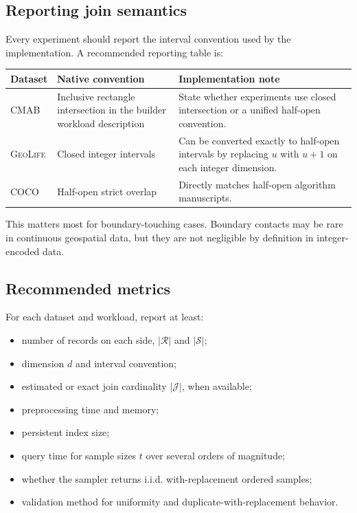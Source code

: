 \documentclass[11pt]{article}
\newcommand{\Rrel}{\mathcal R}
\newcommand{\Srel}{\mathcal S}
\newcommand{\Jset}{\mathcal J}
\newcommand{\cmab}{\textsc{CMAB}}
\newcommand{\geolife}{\textsc{GeoLife}}
\newcommand{\coco}{\textsc{COCO}}
\begin{document}
\subsection{Reporting join semantics}

Every experiment should report the interval convention used by the implementation.  A recommended reporting table is:
\begin{center}
\small
\begin{tabularx}{\textwidth}{@{}lYY@{}}
\toprule
Dataset & Native convention & Implementation note \\
\midrule
\cmab{} & Inclusive rectangle intersection in the builder workload description & State whether experiments use closed intersection or a unified half-open convention. \\
\geolife{} & Closed integer intervals & Can be converted exactly to half-open intervals by replacing $u$ with $u+1$ on each integer dimension. \\
\coco{} & Half-open strict overlap & Directly matches half-open algorithm manuscripts. \\
\bottomrule
\end{tabularx}
\end{center}

This matters most for boundary-touching cases.  Boundary contacts may be rare in continuous geospatial data, but they are not negligible by definition in integer-encoded data.

\subsection{Recommended metrics}

For each dataset and workload, report at least:
\begin{itemize}[leftmargin=2em,itemsep=2pt]
  \item number of records on each side, $|\Rrel|$ and $|\Srel|$;
  \item dimension $d$ and interval convention;
  \item estimated or exact join cardinality $|\Jset|$, when available;
  \item preprocessing time and memory;
  \item persistent index size;
  \item query time for sample sizes $t$ over several orders of magnitude;
  \item whether the sampler returns i.i.d. with-replacement ordered samples;
  \item validation method for uniformity and duplicate-with-replacement behavior.
\end{itemize}
\end{document}
